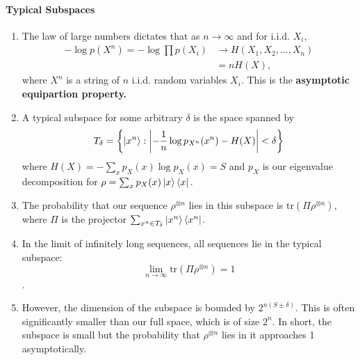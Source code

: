 \documentclass[12pt]{article}
\theoremstyle{remark}
\begin{document}
\paragraph{Typical Subspaces}
\begin{enumerate}
    \item The law of large numbers dictates that as $n\to\infty$ and for i.i.d. $X_i,$
    \begin{align*}-\log p(X^n)= -\log\prod p(X_i)&\to H(X_1,X_2,\dots,X_n) \\&= n H(X),\end{align*} where $X^n$ is a string of $n$ i.i.d. random variables $X_i.$ This is the \textbf{asymptotic equipartion property.}
    
    \item A typical subspace for some arbitrary $\delta$ is the space spanned by
    \[T_\delta =\left\{\ket{x^n}:\left|-\frac{1}{n}\log p_{X^n}(x^n)-H(X)\right|<\delta\right\}\] where $H(X)=-\sum_{x}p_X(x)\log p_X(x)=S$ and $p_X$ is our eigenvalue decomposition for $\rho=\sum_{x}p_X(x)\ket{x}\bra{x}.$ %

    \item The probability that our sequence $\rho^{\otimes n}$ lies in this subspace is $\mathrm{tr}(\Pi\rho^{\otimes n})$, where $\Pi$ is the projector $\sum_{x^n\in T_\delta} \ket{x^n}\bra{x^n}$. 
    
    \item In the limit of infinitely long sequences, all sequences lie in the typical subspace:
    \[\lim_{n\to\infty}\mathrm{tr}(\Pi \rho^{\otimes n})=1\]. 
    
    \item However, the dimension of the subspace is bounded by $2^{n(S\pm\delta)}$. This is often significantly smaller than our full space, which is of size $2^n.$ In short, the subspace is small but the probability that $\rho^{\otimes n}$ lies in it approaches 1 asymptotically.
    \end{enumerate}
\end{document}
